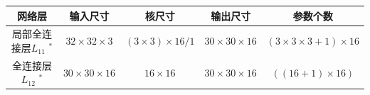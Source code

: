 \documentclass[12pt,a4paper,UTF8,twoside]{book}
\begin{document}
\begin{longtable}[]{@{}ccccc@{}}
\toprule
\begin{minipage}[b]{0.16\columnwidth}\centering
网络层\strut
\end{minipage} & \begin{minipage}[b]{0.18\columnwidth}\centering
输入尺寸\strut
\end{minipage} & \begin{minipage}[b]{0.16\columnwidth}\centering
核尺寸\strut
\end{minipage} & \begin{minipage}[b]{0.20\columnwidth}\centering
输出尺寸\strut
\end{minipage} & \begin{minipage}[b]{0.18\columnwidth}\centering
参数个数\strut
\end{minipage}\tabularnewline
\midrule
\endhead
\begin{minipage}[t]{0.16\columnwidth}\centering
局部全连接层\(L_{11}\) \(^*\)\strut
\end{minipage} & \begin{minipage}[t]{0.18\columnwidth}\centering
\(32\times32\times3\)\strut
\end{minipage} & \begin{minipage}[t]{0.16\columnwidth}\centering
\((3\times3)\times16/1\)\strut
\end{minipage} & \begin{minipage}[t]{0.20\columnwidth}\centering
\(30\times30\times16\)\strut
\end{minipage} & \begin{minipage}[t]{0.18\columnwidth}\centering
\((3\times3\times3+1)\times16\)\strut
\end{minipage}\tabularnewline
\begin{minipage}[t]{0.16\columnwidth}\centering
全连接层\(L_{12}\) \(^*\)\strut
\end{minipage} & \begin{minipage}[t]{0.18\columnwidth}\centering
\(30\times30\times16\)\strut
\end{minipage} & \begin{minipage}[t]{0.16\columnwidth}\centering
\(16\times16\)\strut
\end{minipage} & \begin{minipage}[t]{0.20\columnwidth}\centering
\(30\times30\times16\)\strut
\end{minipage} & \begin{minipage}[t]{0.18\columnwidth}\centering
\(((16+1)\times16)\)\strut

\end{minipage}
\end{longtable}
\end{document}
